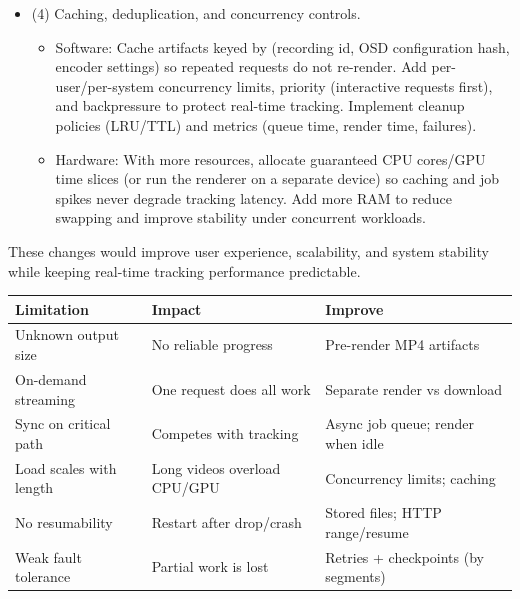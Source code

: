 \documentclass[12pt, titlepage]{article}
\begin{document}
\begin{enumerate}
\begin{itemize}
          \item (4) Caching, deduplication, and concurrency controls.
                \begin{itemize}
                  \item Software: Cache artifacts keyed by (recording id, OSD configuration hash,
                        encoder settings) so repeated requests do not re-render. Add
                        per-user/per-system concurrency limits, priority (interactive requests first),
                        and backpressure to protect real-time tracking. Implement cleanup policies
                        (LRU/TTL) and metrics (queue time, render time, failures).
                  \item Hardware: With more resources, allocate guaranteed CPU cores/GPU time slices
                        (or run the renderer on a separate device) so caching and job spikes never
                        degrade tracking latency. Add more RAM to reduce swapping and improve stability
                        under concurrent workloads.
                \end{itemize}
        \end{itemize}

        These changes would improve user experience, scalability, and system stability
        while keeping real-time tracking performance predictable.

        \begin{table}[H]
          \centering
          \small
          \setlength{\tabcolsep}{3pt}
          \renewcommand{\arraystretch}{1.1}
          \begin{tabular}{p{2.9cm} p{3.5cm} p{3.6cm}}
            \toprule
            \textbf{Limitation}     & \textbf{Impact}              & \textbf{Improve}                    \\
            \midrule
            Unknown output size     & No reliable progress         & Pre-render MP4 artifacts            \\
            On-demand streaming     & One request does all work    & Separate render vs download         \\
            Sync on critical path   & Competes with tracking       & Async job queue; render when idle   \\
            Load scales with length & Long videos overload CPU/GPU & Concurrency limits; caching         \\
            No resumability         & Restart after drop/crash     & Stored files; HTTP range/resume     \\
            Weak fault tolerance    & Partial work is lost         & Retries + checkpoints (by segments) \\
            \bottomrule
          \end{tabular}
        \end{table}


\end{enumerate}
\end{document}
